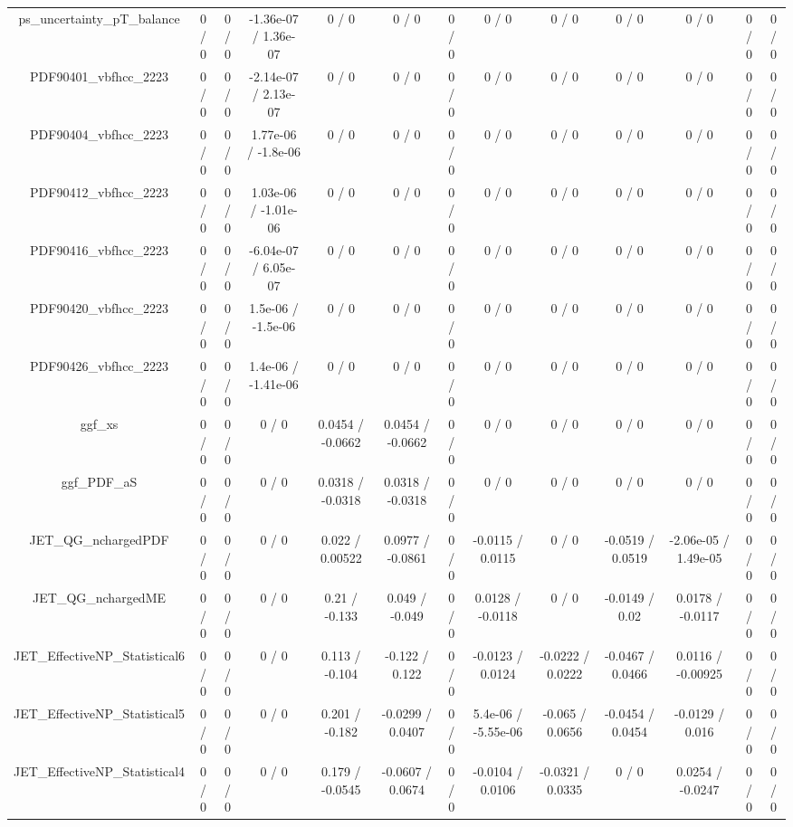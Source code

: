 \documentclass[10pt]{article}
\begin{document}
\begin{table}[htbp]
\begin{center}
\begin{tabular}{|c|c|c|c|c|c|c|c|c|c|c|c|c|}
  ps_uncertainty_pT_balance & 0 / 0 & 0 / 0 & -1.36e-07 / 1.36e-07 & 0 / 0 & 0 / 0 & 0 / 0 & 0 / 0 & 0 / 0 & 0 / 0 & 0 / 0 & 0 / 0 & 0 / 0 \\ 
  PDF90401_vbfhcc_2223 & 0 / 0 & 0 / 0 & -2.14e-07 / 2.13e-07 & 0 / 0 & 0 / 0 & 0 / 0 & 0 / 0 & 0 / 0 & 0 / 0 & 0 / 0 & 0 / 0 & 0 / 0 \\ 
  PDF90404_vbfhcc_2223 & 0 / 0 & 0 / 0 & 1.77e-06 / -1.8e-06 & 0 / 0 & 0 / 0 & 0 / 0 & 0 / 0 & 0 / 0 & 0 / 0 & 0 / 0 & 0 / 0 & 0 / 0 \\ 
  PDF90412_vbfhcc_2223 & 0 / 0 & 0 / 0 & 1.03e-06 / -1.01e-06 & 0 / 0 & 0 / 0 & 0 / 0 & 0 / 0 & 0 / 0 & 0 / 0 & 0 / 0 & 0 / 0 & 0 / 0 \\ 
  PDF90416_vbfhcc_2223 & 0 / 0 & 0 / 0 & -6.04e-07 / 6.05e-07 & 0 / 0 & 0 / 0 & 0 / 0 & 0 / 0 & 0 / 0 & 0 / 0 & 0 / 0 & 0 / 0 & 0 / 0 \\ 
  PDF90420_vbfhcc_2223 & 0 / 0 & 0 / 0 & 1.5e-06 / -1.5e-06 & 0 / 0 & 0 / 0 & 0 / 0 & 0 / 0 & 0 / 0 & 0 / 0 & 0 / 0 & 0 / 0 & 0 / 0 \\ 
  PDF90426_vbfhcc_2223 & 0 / 0 & 0 / 0 & 1.4e-06 / -1.41e-06 & 0 / 0 & 0 / 0 & 0 / 0 & 0 / 0 & 0 / 0 & 0 / 0 & 0 / 0 & 0 / 0 & 0 / 0 \\ 
  ggf_xs & 0 / 0 & 0 / 0 & 0 / 0 & 0.0454 / -0.0662 & 0.0454 / -0.0662 & 0 / 0 & 0 / 0 & 0 / 0 & 0 / 0 & 0 / 0 & 0 / 0 & 0 / 0 \\ 
  ggf_PDF_aS & 0 / 0 & 0 / 0 & 0 / 0 & 0.0318 / -0.0318 & 0.0318 / -0.0318 & 0 / 0 & 0 / 0 & 0 / 0 & 0 / 0 & 0 / 0 & 0 / 0 & 0 / 0 \\ 
  JET_QG_nchargedPDF & 0 / 0 & 0 / 0 & 0 / 0 & 0.022 / 0.00522 & 0.0977 / -0.0861 & 0 / 0 & -0.0115 / 0.0115 & 0 / 0 & -0.0519 / 0.0519 & -2.06e-05 / 1.49e-05 & 0 / 0 & 0 / 0 \\ 
  JET_QG_nchargedME & 0 / 0 & 0 / 0 & 0 / 0 & 0.21 / -0.133 & 0.049 / -0.049 & 0 / 0 & 0.0128 / -0.0118 & 0 / 0 & -0.0149 / 0.02 & 0.0178 / -0.0117 & 0 / 0 & 0 / 0 \\ 
  JET_EffectiveNP_Statistical6 & 0 / 0 & 0 / 0 & 0 / 0 & 0.113 / -0.104 & -0.122 / 0.122 & 0 / 0 & -0.0123 / 0.0124 & -0.0222 / 0.0222 & -0.0467 / 0.0466 & 0.0116 / -0.00925 & 0 / 0 & 0 / 0 \\ 
  JET_EffectiveNP_Statistical5 & 0 / 0 & 0 / 0 & 0 / 0 & 0.201 / -0.182 & -0.0299 / 0.0407 & 0 / 0 & 5.4e-06 / -5.55e-06 & -0.065 / 0.0656 & -0.0454 / 0.0454 & -0.0129 / 0.016 & 0 / 0 & 0 / 0 \\ 
  JET_EffectiveNP_Statistical4 & 0 / 0 & 0 / 0 & 0 / 0 & 0.179 / -0.0545 & -0.0607 / 0.0674 & 0 / 0 & -0.0104 / 0.0106 & -0.0321 / 0.0335 & 0 / 0 & 0.0254 / -0.0247 & 0 / 0 & 0 / 0 \\ 

\end{tabular}
\end{center}
\end{table}
\end{document}
